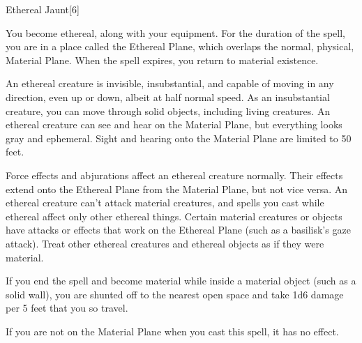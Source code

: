 \begin{spellsection}{Ethereal Jaunt}[6]
    \begin{spellheader}
    \end{spellheader}
    \begin{spellcontent}
        \begin{spelltargetinginfo}
        \end{spelltargetinginfo}
        \begin{spelleffects}
            \spelleffect You become ethereal, along with your equipment. For the duration of the spell, you are in a place called the Ethereal Plane, which overlaps the normal, physical, Material Plane. When the spell expires, you return to material existence.
            \par An ethereal creature is invisible, insubstantial, and capable of moving in any direction, even up or down, albeit at half normal speed. As an insubstantial creature, you can move through solid objects, including living creatures. An ethereal creature can see and hear on the Material Plane, but everything looks gray and ephemeral. Sight and hearing onto the Material Plane are limited to 50 feet.
            \par Force effects and abjurations affect an ethereal creature normally. Their effects extend onto the Ethereal Plane from the Material Plane, but not vice versa. An ethereal creature can't attack material creatures, and spells you cast while ethereal affect only other ethereal things. Certain material creatures or objects have attacks or effects that work on the Ethereal Plane (such as a basilisk's gaze attack). Treat other ethereal creatures and ethereal objects as if they were material. 
            \par If you end the spell and become material while inside a material object (such as a solid wall), you are shunted off to the nearest open space and take 1d6 damage per 5 feet that you so travel.
            \spelldur \durshort \dismissable
        \end{spelleffects}
    \end{spellcontent}
    \begin{spellfooter}
        \spellnotes If you are not on the Material Plane when you cast this spell, it has no effect.
        \miscastexplode
    \end{spellfooter}
\end{spellsection}

